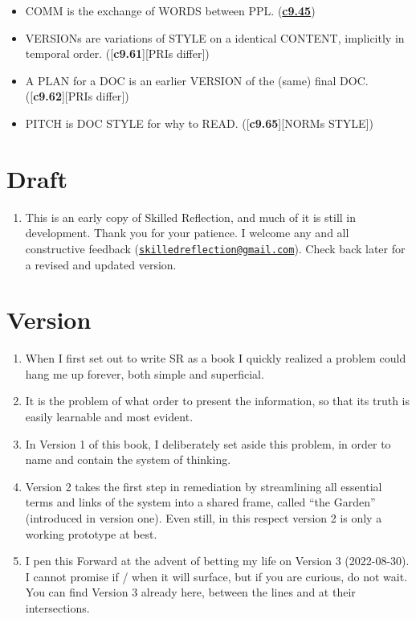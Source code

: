 \documentclass[
]{book}
\providecommand{\tightlist}{%
  \setlength{\itemsep}{0pt}\setlength{\parskip}{0pt}}
\begin{document}
\begin{itemize}
\item
  COMM is the exchange of WORDS between PPL. (\protect\hyperlink{style}{\textbf{c9.45}})\\
\item
  VERSIONs are variations of STYLE on a identical CONTENT, implicitly in temporal order. ({[}\textbf{c9.61}{]}{[}PRIs differ{]})\\
\item
  A PLAN for a DOC is an earlier VERSION of the (same) final DOC. ({[}\textbf{c9.62}{]}{[}PRIs differ{]})\\
\item
  PITCH is DOC STYLE for why to READ. ({[}\textbf{c9.65}{]}{[}NORMs STYLE{]})
\end{itemize}

\hypertarget{draft}{%
\section{Draft}\label{draft}}

\begin{enumerate}
\def\labelenumi{\arabic{enumi}.}
\setcounter{enumi}{7}
\tightlist
\item
  This is an early copy of Skilled Reflection, and much of it is still in development. Thank you for your patience. I welcome any and all constructive feedback (\href{mailto:skilledreflection@gmail.com}{\nolinkurl{skilledreflection@gmail.com}}). Check back later for a revised and updated version.
\end{enumerate}

\hypertarget{version}{%
\section{Version}\label{version}}

\begin{enumerate}
\def\labelenumi{\arabic{enumi}.}
\setcounter{enumi}{8}
\item
  When I first set out to write SR as a book I quickly realized a problem could hang me up forever, both simple and superficial.
\item
  It is the problem of what order to present the information, so that its truth is easily learnable and most evident.
\item
  In Version 1 of this book, I deliberately set aside this problem, in order to name and contain the system of thinking.
\item
  Version 2 takes the first step in remediation by streamlining all essential terms and links of the system into a shared frame, called ``the Garden'' (introduced in version one). Even still, in this respect version 2 is only a working prototype at best.
\item
  I pen this Forward at the advent of betting my life on Version 3 (2022-08-30). I cannot promise if / when it will surface, but if you are curious, do not wait. You can find Version 3 already here, between the lines and at their intersections.
\end{enumerate}
\end{document}
